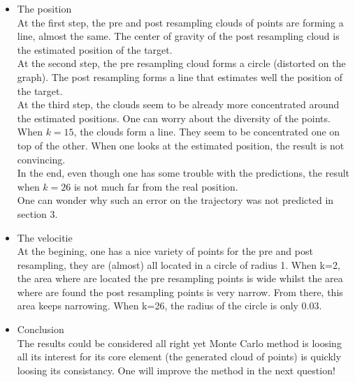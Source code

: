 \documentclass[english,DIV=13]{scrartcl}
\begin{document}
\begin{itemize}
\item The position\\
At the first step, the pre and post resampling clouds of points are forming a line, almost
the same. The center of gravity of the post resampling cloud is the estimated position
of the target.\\
At the second step, the pre resampling cloud forms a circle (distorted on the graph). 
The post resampling forms a line that estimates well the position of the target.\\
At the third step, the clouds seem to be already more concentrated around
the estimated positions. One can worry about the diversity of the points.\\
When $k=15$, the clouds form a line. They seem to be concentrated one
on top of the other. When one looks at the estimated position, the result
is not convincing. \\
In the end, even though one has some trouble with the predictions, the result
when $k=26$ is not much far from the real position.\\
One can wonder why such an error on the trajectory was not predicted in
section 3.

\item The velocitie\\
At the begining, one has a nice variety of points for the pre and post
resampling, they are (almost) all located in a circle of radius 1.
When k=2, the area where are located the pre resampling points is wide whilst
the area where are found the post resampling points is very narrow. From there, 
this area keeps narrowing. When k=26, the radius of the circle is only 0.03.

\item Conclusion\\
The results could be considered all right yet Monte Carlo method is loosing all its interest
for its core element (the generated cloud of points) is quickly loosing its
consistancy. One will improve the method in the next question!
\end{itemize} 
\end{document}
